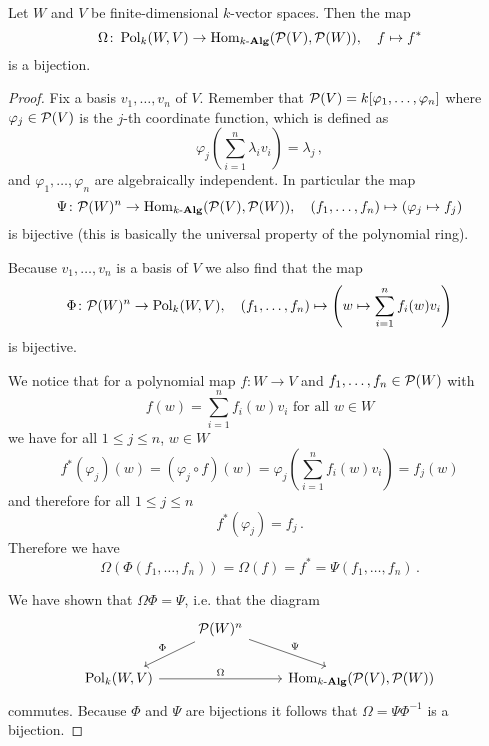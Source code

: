 \begin{proposition}
  Let $W$ and $V$ be finite-dimensional $k$-vector spaces.
  Then the map
  \[
            \Omega
    \colon  \operatorname{Pol}_k(W,V)
    \to     \operatorname{Hom}_{k\text{-}\mathbf{Alg}}(\mathcal{P}(V), \mathcal{P}(W)),
    \quad   f
    \mapsto f^*
  \]
  is a bijection.
\end{proposition}
\begin{proof}
  Fix a basis $v_1, \dotsc, v_n$ of $V$.
  Remember that $\mathcal{P}(V) = k[\varphi_1, \dotsc, \varphi_n]$ where $\varphi_j \in \mathcal{P}(V)$ is the $j$-th coordinate function, which is defined as
  \[
      \varphi_j\left( \sum_{i=1}^n \lambda_i v_i \right)
    = \lambda_j \,,
\]
  and $\varphi_1, \dotsc, \varphi_n$ are algebraically independent.
  In particular the map
  \[
            \Psi
    \colon  \mathcal{P}(W)^n
    \to     \operatorname{Hom}_{k\text{-}\mathbf{Alg}}(\mathcal{P}(V),\mathcal{P}(W)),
    \quad   (f_1, \dotsc, f_n)
    \mapsto (\varphi_j \mapsto f_j)
  \]
  is bijective (this is basically the universal property of the polynomial ring).
  
  Because $v_1, \dotsc, v_n$ is a basis of $V$ we also find that the map
  \[
            \Phi
    \colon  \mathcal{P}(W)^n
    \to     \operatorname{Pol}_k(W,V),
    \quad   (f_1, \dotsc, f_n)
    \mapsto \left(
                      w
              \mapsto \sum_{i=1}^n f_i(w)v_i
            \right)
  \]
  is bijective.
  
  We notice that for a polynomial map $f \colon W \to V$ and $f_1, \dotsc, f_n \in \mathcal{P}(W)$ with
  \[
      f(w)
    = \sum_{i=1}^n f_i(w) v_i
    \text{ for all }
    w \in W
  \]
  we have for all $1 \leq j \leq n$, $w \in W$
  \[
      f^*(\varphi_j)(w)
    = (\varphi_j \circ f)(w)
    = \varphi_j\left( \sum_{i=1}^n f_i(w) v_i \right)
    = f_j(w)
  \]
  and therefore for all $1 \leq j \leq n$
  \[
      f^*(\varphi_j)
    = f_j \,.
  \]
  Therefore we have
  \[
      \Omega(\Phi(f_1, \dotsc, f_n))
    = \Omega(f)
    = f^*
    = \Psi(f_1, \dotsc, f_n) \,.
  \]
  
  We have shown that $\Omega \Phi = \Psi$, i.e. that the diagram
  \[
    \begin{tikzcd}
        {}
      & \mc{P}(W)^n
        \arrow[swap]{dl}{\Phi}
        \arrow{dr}{\Psi}
      & {}
      \\
        \Pol_k(W,V)
        \arrow{rr}{\Omega}
      & {}
      & \Hom_{\cAlg{k}}(\mc{P}(V),\mc{P}(W))
    \end{tikzcd}
  \]
  commutes.
  Because $\Phi$ and $\Psi$ are bijections it follows that $\Omega = \Psi \Phi^{-1}$ is a bijection.
\end{proof}





